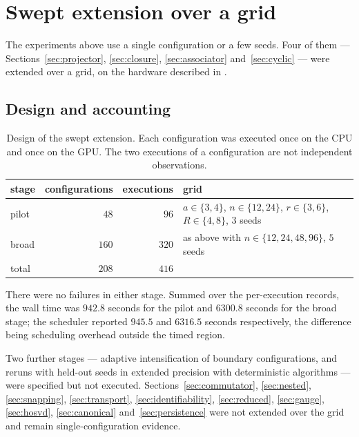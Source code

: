\documentclass[11pt]{amsart}
\theoremstyle{remark}
\begin{document}
\section{Swept extension over a grid}
\label{sec:sweep}

The experiments above use a single configuration or a few seeds. Four of them ---
Sections~\ref{sec:projector}, \ref{sec:closure}, \ref{sec:associator}
and~\ref{sec:cyclic} --- were extended over a grid, on the hardware described in
\cite{ChaveroJassoSoftware}.

\subsection{Design and accounting}

\begin{table}[h]
\centering\small
\caption{Design of the swept extension. Each configuration was executed once on the CPU and
once on the GPU. The two executions of a configuration are not independent observations.}
\label{tab:sweepdesign}
\begin{tabular}{@{}lrrl@{}}
\toprule
stage & configurations & executions & grid \\
\midrule
pilot & $48$ & $96$ & $a\in\{3,4\}$, $n\in\{12,24\}$, $r\in\{3,6\}$, $R\in\{4,8\}$, $3$ seeds \\
broad & $160$ & $320$ & as above with $n\in\{12,24,48,96\}$, $5$ seeds \\
\midrule
total & $208$ & $416$ & \\
\bottomrule
\end{tabular}
\end{table}

There were no failures in either stage. Summed over the per-execution records, the wall
time was $942.8$ seconds for the pilot and $6300.8$ seconds for the broad stage; the
scheduler reported $945.5$ and $6316.5$ seconds respectively, the difference being
scheduling overhead outside the timed region.

Two further stages --- adaptive intensification of boundary configurations, and reruns with
held-out seeds in extended precision with deterministic algorithms --- were specified but
not executed. Sections~\ref{sec:commutator}, \ref{sec:nested}, \ref{sec:snapping},
\ref{sec:transport}, \ref{sec:identifiability}, \ref{sec:reduced}, \ref{sec:gauge},
\ref{sec:hosvd}, \ref{sec:canonical} and~\ref{sec:persistence} were not extended over the
grid and remain single-configuration evidence.
\end{document}
